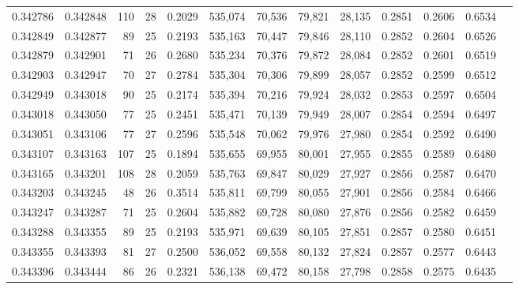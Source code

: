\begin{tabular}{rrrrrrrrrrrrr}
0.342786 & 0.342848 &   110 &  28 &                                     0.2029 & 535,074 &  70,536 &  79,821 &  28,135 & 0.2851 & 0.2606 & 0.6534 \\
0.342849 & 0.342877 &    89 &  25 &                                     0.2193 & 535,163 &  70,447 &  79,846 &  28,110 & 0.2852 & 0.2604 & 0.6526 \\
0.342879 & 0.342901 &    71 &  26 &                                     0.2680 & 535,234 &  70,376 &  79,872 &  28,084 & 0.2852 & 0.2601 & 0.6519 \\
0.342903 & 0.342947 &    70 &  27 &                                     0.2784 & 535,304 &  70,306 &  79,899 &  28,057 & 0.2852 & 0.2599 & 0.6512 \\
0.342949 & 0.343018 &    90 &  25 &                                     0.2174 & 535,394 &  70,216 &  79,924 &  28,032 & 0.2853 & 0.2597 & 0.6504 \\
0.343018 & 0.343050 &    77 &  25 &                                     0.2451 & 535,471 &  70,139 &  79,949 &  28,007 & 0.2854 & 0.2594 & 0.6497 \\
0.343051 & 0.343106 &    77 &  27 &                                     0.2596 & 535,548 &  70,062 &  79,976 &  27,980 & 0.2854 & 0.2592 & 0.6490 \\
0.343107 & 0.343163 &   107 &  25 &                                     0.1894 & 535,655 &  69,955 &  80,001 &  27,955 & 0.2855 & 0.2589 & 0.6480 \\
0.343165 & 0.343201 &   108 &  28 &                                     0.2059 & 535,763 &  69,847 &  80,029 &  27,927 & 0.2856 & 0.2587 & 0.6470 \\
0.343203 & 0.343245 &    48 &  26 &                                     0.3514 & 535,811 &  69,799 &  80,055 &  27,901 & 0.2856 & 0.2584 & 0.6466 \\
0.343247 & 0.343287 &    71 &  25 &                                     0.2604 & 535,882 &  69,728 &  80,080 &  27,876 & 0.2856 & 0.2582 & 0.6459 \\
0.343288 & 0.343355 &    89 &  25 &                                     0.2193 & 535,971 &  69,639 &  80,105 &  27,851 & 0.2857 & 0.2580 & 0.6451 \\
0.343355 & 0.343393 &    81 &  27 &                                     0.2500 & 536,052 &  69,558 &  80,132 &  27,824 & 0.2857 & 0.2577 & 0.6443 \\
0.343396 & 0.343444 &    86 &  26 &                                     0.2321 & 536,138 &  69,472 &  80,158 &  27,798 & 0.2858 & 0.2575 & 0.6435 \\

\end{tabular}
